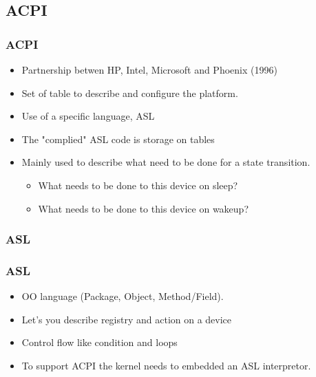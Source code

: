 \subsection{ACPI}
        \begin{frame}
                \frametitle{ACPI}
                \begin{itemize}
                        \item Partnership betwen HP, Intel, Microsoft
                        and Phoenix (1996)
                        \item Set of table to describe and configure the
                        platform.
                        \item Use of a specific language, ASL
                        \item The "complied" ASL code is storage on
                        tables

                        \item Mainly used to describe what need to be
                        done for a state transition.
                                \begin{itemize}
                                        \item What needs to be done to
                                        this device on sleep?
                                        \item What needs to be done to
                                        this device on wakeup?
                                \end{itemize}
                \end{itemize}
        \end{frame}

\subsubsection{ASL}
        \begin{frame}
                \frametitle{ASL}
                \begin{itemize}
                        \item OO language (Package, Object,
                        Method/Field).
                        \item Let's you describe registry and action on
                        a device
                        \item Control flow like condition and loops
                        \item To support ACPI the kernel needs to
                        embedded an ASL interpretor.
                \end{itemize}
        \end{frame}

